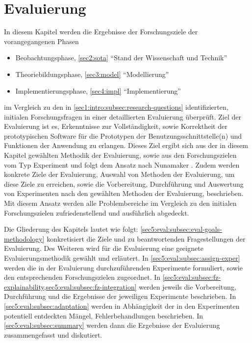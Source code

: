 \section{Evaluierung}
\label{sec5:eval}
In diesem Kapitel werden die Ergebnisse der Forschungsziele der vorangegangenen Phasen
\begin{itemize}
  \item Beobachtungsphase, \cref{sec2:sota} \enquote{Stand der Wissenschaft und Technik}
  \item Theoriebildungsphase, \cref{sec3:model} \enquote{Modellierung}
  \item Implementierungsphase, \cref{sec4:impl} \enquote{Implementierung}
\end{itemize}
im Vergleich zu den in \cref{sec1:intro:subsec:research-questions} identifizierten, initialen Forschungsfragen in einer detaillierten Evaluierung überprüft.
Ziel der Evaluierung ist es, Erkenntnisse zur Vollständigkeit, sowie Korrektheit der prototypischen Software für die Prototypen der Benutzungsschnittstelle(n) und Funktionen der Anwendung zu erlangen.
Dieses Ziel ergibt sich aus der in diesem Kapitel gewählten Methodik der Evaluierung, sowie aus den Forschungszielen vom Typ Experiment und folgt dem Ansatz nach Nunamaker \cite{nunamaker}.
Zudem werden konkrete Ziele der Evaluierung, Auswahl von Methoden der Evaluierung, um diese Ziele zu erreichen, sowie die Vorbereitung, Durchführung und Auswertung von Experimenten nach den gewählten Methoden der Evaluierung, beschrieben.
Mit diesem Ansatz werden alle Problembereiche im Vergleich zu den initialen Forschungszielen zufriedenstellend und ausführlich abgedeckt.

Die Gliederung des Kapitels lautet wie folgt:
\cref{sec5:eval:subsec:eval-goals-methodology} konkretisiert die Ziele und zu beantwortenden Fragestellungen der Evaluierung.
Des Weiteren wird für die Evaluierung eine geeignete Evaluierungsmethodik gewählt und erläutert.
In \cref{sec5:eval:subsec:assign-exper} werden die in der Evaluierung durchzuführenden Experimente formuliert, sowie den entsprechenden Forschungszielen zugeordnet.
In \cref{sec5:eval:subsec:fz-explainability,sec5:eval:subsec:fz-integration} werden jeweils die Vorbereitung, Durchführung und die Ergebnisse der jeweiligen Experimente beschrieben.
In \cref{sec5:eval:subsec:adaptation} werden in Abhängigkeit der in den Experimenten potentiell entdeckten Mängel, Fehlerbehandlungen beschrieben.
In \cref{sec5:eval:subsec:summary} werden dann die Ergebnisse der Evaluierung zusammengefasst und diskutiert.

